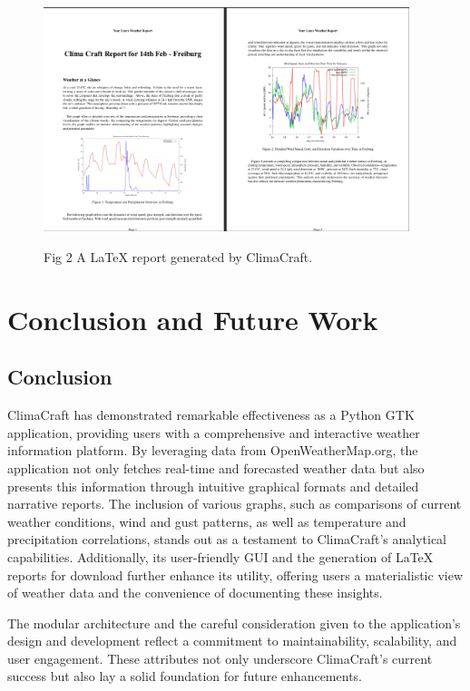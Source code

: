 \documentclass[sn-mathphys-num]{sn-jnl}%
\begin{document}
\begin{figure}[htbp]
    \centering
    \includegraphics[width=0.95\textwidth]{Latexreport.png}
    \parbox{\textwidth}{\centering Fig 2 A LaTeX report generated by ClimaCraft.}
    \label{fig:latexreport}
\end{figure}

\clearpage

\section{Conclusion and Future Work}\label{sec5}

\subsection{Conclusion}\label{sec5.1}
ClimaCraft has demonstrated remarkable effectiveness as a Python GTK application, providing users with a comprehensive and interactive weather information platform. By leveraging data from OpenWeatherMap.org, the application not only fetches real-time and forecasted weather data but also presents this information through intuitive graphical formats and detailed narrative reports. The inclusion of various graphs, such as comparisons of current weather conditions, wind and gust patterns, as well as temperature and precipitation correlations, stands out as a testament to ClimaCraft's analytical capabilities. Additionally, its user-friendly GUI and the generation of LaTeX reports for download further enhance its utility, offering users a materialistic view of weather data and the convenience of documenting these insights.

The modular architecture and the careful consideration given to the application's design and development reflect a commitment to maintainability, scalability, and user engagement. These attributes not only underscore ClimaCraft's current success but also lay a solid foundation for future enhancements.
\end{document}
